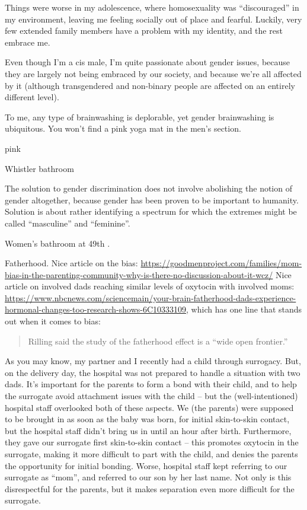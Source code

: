 \documentclass[]{article}
\begin{document}
Things were worse in my adolescence, where homosexuality was ``discouraged'' in my environment, leaving me feeling socially out of place and fearful. Luckily, very few extended family members have a problem with my identity, and the rest embrace me.

Even though I'm a cis male, I'm quite passionate about gender issues, because they are largely not being embraced by our society, and because we're all affected by it (although transgendered and non-binary people are affected on an entirely different level).

To me, any type of brainwashing is deplorable, yet gender brainwashing is ubiquitous. You won't find a pink yoga mat in the men's section.

pink

Whistler bathroom

The solution to gender discrimination does not involve abolishing the notion of gender altogether, because gender has been proven to be important to humanity. Solution is about rather identifying a spectrum for which the extremes might be called ``masculine'' and ``feminine''.

Women's bathroom at 49th \textbar\textbar.

Fatherhood. Nice article on the bias: \url{https://goodmenproject.com/families/mom-bias-in-the-parenting-community-why-is-there-no-discussion-about-it-wcz/}
Nice article on involved dads reaching similar levels of oxytocin with involved moms: \url{https://www.nbcnews.com/sciencemain/your-brain-fatherhood-dads-experience-hormonal-changes-too-research-shows-6C10333109}, which has one line that stands out when it comes to bias:

\begin{quote}
Rilling said the study of the fatherhood effect is a ``wide open frontier.''
\end{quote}

As you may know, my partner and I recently had a child through surrogacy. But, on the delivery day, the hospital was not prepared to handle a situation with two dads. It's important for the parents to form a bond with their child, and to help the surrogate avoid attachment issues with the child -- but the (well-intentioned) hospital staff overlooked both of these aspects. We (the parents) were supposed to be brought in as soon as the baby was born, for initial skin-to-skin contact, but the hospital staff didn't bring us in until an hour after birth. Furthermore, they gave our surrogate first skin-to-skin contact -- this promotes oxytocin in the surrogate, making it more difficult to part with the child, and denies the parents the opportunity for initial bonding. Worse, hospital staff kept referring to our surrogate as ``mom'', and referred to our son by her last name. Not only is this disrespectful for the parents, but it makes separation even more difficult for the surrogate.
\end{document}
